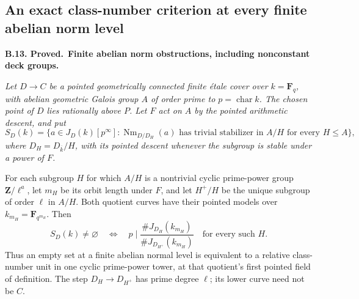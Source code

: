\documentclass[11pt,a4paper]{article}
\newenvironment{claim}[3]{\par\medskip\noindent\hypertarget{#1}{\textbf{#1. #2.}}\ \textbf{#3.}\par\nopagebreak\smallskip\begingroup\itshape}{\endgroup\par\smallskip}
\begin{document}
\subsection{An exact class-number criterion at every finite abelian norm level}

\begin{claim}{B.13}{Proved}{Finite abelian norm obstructions, including nonconstant deck groups}
Let $D\to C$ be a pointed geometrically connected finite
\emph{\'etale} cover over $k=\mathbf F_q$, with abelian geometric
Galois group $A$ of order prime to $p=\operatorname{char}k$.
The chosen point of $D$ lies rationally above $P$.
Let $F$ act on $A$ by the pointed arithmetic descent, and put
\[
 S_D(k)=\{a\in J_D(k)[p^\infty]:
    \operatorname{Nm}_{D/D_H}(a)
    \text{ has trivial stabilizer in }A/H
                   \text{ for every }H\le A\},                 \tag{B.AB.1}
\]
where $D_H=D_{\overline k}/H$, with its pointed descent whenever
the subgroup is stable under a power of $F$.

For each subgroup $H$ for which $A/H$ is a nontrivial cyclic
prime-power group $\mathbf Z/\ell^a$, let $m_H$ be its orbit
length under $F$, and let $H^+/H$ be the unique subgroup of
order $\ell$ in $A/H$. Both quotient curves have their pointed
models over $k_{m_H}=\mathbf F_{q^{m_H}}$. Then
\[
 S_D(k)\ne\varnothing
 \quad\Longleftrightarrow\quad
 p\mid
 \frac{\#J_{D_H}(k_{m_H})}{\#J_{D_{H^+}}(k_{m_H})}
 \quad\text{for every such }H.                                \tag{B.AB.2}
\]
Thus an empty set at a finite abelian normal level is equivalent
to a relative class-number unit in one cyclic prime-power tower,
at that quotient's first pointed field of definition. The step
$D_H\to D_{H^+}$ has prime degree $\ell$; its lower curve need
not be $C$.
\end{claim}
\end{document}
